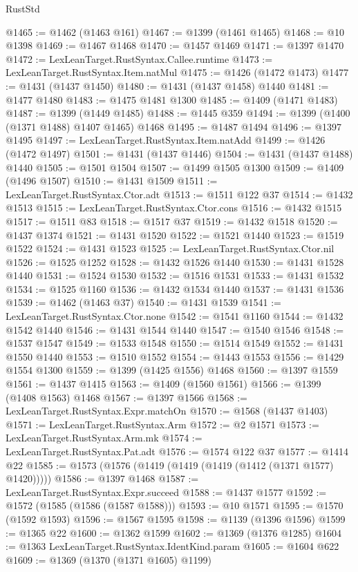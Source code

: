 \begin{lexlean}{RustStd}
\begin{coremodule}
@1465 := @1462 (@1463 @161)
@1467 := @1399 (@1461 @1465)
@1468 := @10 @1398
@1469 := @1467 @1468
@1470 := @1457 @1469
@1471 := @1397 @1470
@1472 := LexLeanTarget.RustSyntax.Callee.runtime
@1473 := LexLeanTarget.RustSyntax.Item.natMul
@1475 := @1426 (@1472 @1473)
@1477 := @1431 (@1437 @1450)
@1480 := @1431 (@1437 @1458) @1440
@1481 := @1477 @1480
@1483 := @1475 @1481 @1300
@1485 := @1409 (@1471 @1483)
@1487 := @1399 (@1449 @1485)
@1488 := @1445 @359
@1494 := @1399 (@1400 (@1371 @1488) @1407 @1465) @1468
@1495 := @1487 @1494
@1496 := @1397 @1495
@1497 := LexLeanTarget.RustSyntax.Item.natAdd
@1499 := @1426 (@1472 @1497)
@1501 := @1431 (@1437 @1446)
@1504 := @1431 (@1437 @1488) @1440
@1505 := @1501 @1504
@1507 := @1499 @1505 @1300
@1509 := @1409 (@1496 @1507)
@1510 := @1431 @1509
@1511 := LexLeanTarget.RustSyntax.Ctor.adt
@1513 := @1511 @122 @37
@1514 := @1432 @1513
@1515 := LexLeanTarget.RustSyntax.Ctor.cons
@1516 := @1432 @1515
@1517 := @1511 @83
@1518 := @1517 @37
@1519 := @1432 @1518
@1520 := @1437 @1374
@1521 := @1431 @1520
@1522 := @1521 @1440
@1523 := @1519 @1522
@1524 := @1431 @1523
@1525 := LexLeanTarget.RustSyntax.Ctor.nil
@1526 := @1525 @1252
@1528 := @1432 @1526 @1440
@1530 := @1431 @1528 @1440
@1531 := @1524 @1530
@1532 := @1516 @1531
@1533 := @1431 @1532
@1534 := @1525 @1160
@1536 := @1432 @1534 @1440
@1537 := @1431 @1536
@1539 := @1462 (@1463 @37)
@1540 := @1431 @1539
@1541 := LexLeanTarget.RustSyntax.Ctor.none
@1542 := @1541 @1160
@1544 := @1432 @1542 @1440
@1546 := @1431 @1544 @1440
@1547 := @1540 @1546
@1548 := @1537 @1547
@1549 := @1533 @1548
@1550 := @1514 @1549
@1552 := @1431 @1550 @1440
@1553 := @1510 @1552
@1554 := @1443 @1553
@1556 := @1429 @1554 @1300
@1559 := @1399 (@1425 @1556) @1468
@1560 := @1397 @1559
@1561 := @1437 @1415
@1563 := @1409 (@1560 @1561)
@1566 := @1399 (@1408 @1563) @1468
@1567 := @1397 @1566
@1568 := LexLeanTarget.RustSyntax.Expr.matchOn
@1570 := @1568 (@1437 @1403)
@1571 := LexLeanTarget.RustSyntax.Arm
@1572 := @2 @1571
@1573 := LexLeanTarget.RustSyntax.Arm.mk
@1574 := LexLeanTarget.RustSyntax.Pat.adt
@1576 := @1574 @122 @37
@1577 := @1414 @22
@1585 := @1573 (@1576 (@1419 (@1419 (@1419 (@1412 (@1371 @1577) @1420)))))
@1586 := @1397 @1468
@1587 := LexLeanTarget.RustSyntax.Expr.succeed
@1588 := @1437 @1577
@1592 := @1572 (@1585 (@1586 (@1587 @1588)))
@1593 := @10 @1571
@1595 := @1570 (@1592 @1593)
@1596 := @1567 @1595
@1598 := @1139 (@1396 @1596)
@1599 := @1365 @22
@1600 := @1362 @1599
@1602 := @1369 (@1376 @1285)
@1604 := @1363 LexLeanTarget.RustSyntax.IdentKind.param
@1605 := @1604 @622
@1609 := @1369 (@1370 (@1371 @1605) @1199)

\end{coremodule}
\end{lexlean}
